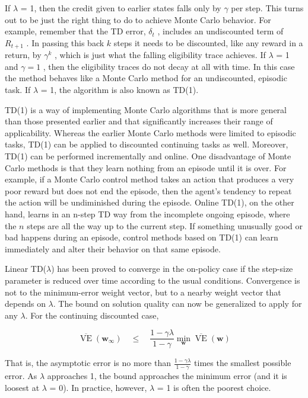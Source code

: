 \documentclass{article}
\begin{document}
If $\lambda$ = 1, then the credit given to earlier states falls only by $\gamma$ per step. This turns out to be just the right thing to do to achieve Monte Carlo behavior. For example, remember that the TD error, $\delta _ { t }$ , 
includes an undiscounted term of $R _ { t + 1 }$ . In passing this back $k$ steps it needs to be discounted, like any reward in a return, by $\gamma ^ { k }$ , which is just what the falling eligibility trace achieves. 
If $\lambda$ = 1 and $\gamma = 1$ , then the eligibility traces do not decay at all with time. In this case the method behaves like a Monte Carlo method for an undiscounted, episodic task. If $\lambda$ = 1, the algorithm is also known as TD(1).

TD(1) is a way of implementing Monte Carlo algorithms that is more general than those presented earlier and that significantly increases their range of applicability. Whereas the earlier Monte Carlo methods were limited to episodic tasks, 
TD(1) can be applied to discounted continuing tasks as well. Moreover, TD(1) can be performed incrementally and online. One disadvantage of Monte Carlo methods is that they learn nothing from an episode until it is over. For example, 
if a Monte Carlo control method takes an action that produces a very poor reward but does not end the episode, then the agent's tendency to repeat the action will be undiminished during the episode. Online TD(1), on the other hand, 
learns in an n-step TD way from the incomplete ongoing episode, where the $n$ steps are all the way up to the current step. If something unusually good or bad happens during an episode, control methods based on TD(1) can learn immediately 
and alter their behavior on that same episode.

Linear TD($\lambda$) has been proved to converge in the on-policy case if the step-size parameter is reduced over time according to the usual conditions. Convergence is not to the minimum-error weight vector, 
but to a nearby weight vector that depends on $\lambda$. The bound on solution quality can now be generalized to apply for any $\lambda$. For the continuing discounted case,

$$
\overline { { \operatorname { V E } } } ( \mathbf { w } _ { \infty } ) \quad \leq \quad \frac { 1 - \gamma \lambda } { 1 - \gamma } \operatorname* { m i n } _ { \mathbf { w } } \overline { { \operatorname { V E } } } ( \mathbf { w } )
$$

That is, the asymptotic error is no more than $\textstyle { \frac { 1 - \gamma \lambda } { 1 - \gamma } }$ times the smallest possible error. As $\lambda$ approaches 1, the bound approaches the minimum error (and it is loosest at $\lambda$ = 0). 
In practice, however, $\lambda$ = 1 is often the poorest choice.
\end{document}
